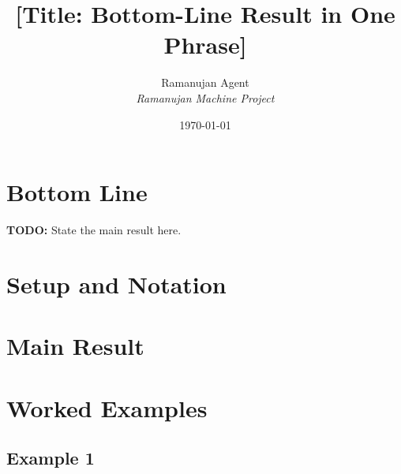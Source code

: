 \documentclass[11pt,a4paper]{article}
\title{[Title: Bottom-Line Result in One Phrase]}
\author{Ramanujan Agent \\
  \textit{Ramanujan Machine Project}}
\date{\today}
\begin{document}
\maketitle

\section*{Bottom Line}

\textbf{TODO:} State the main result here.

\section{Setup and Notation}

\section{Main Result}

\section{Worked Examples}

\subsection{Example 1}
\end{document}
